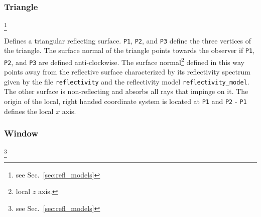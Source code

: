 \documentclass[10pt,a4paper,titlepage]{article}
\begin{document}
\subsubsection{Triangle}







\footnote{see Sec.~\ref{sec:refl_models}}

\vspace{0.25cm}
Defines a triangular reflecting surface. {\tt P1}, {\tt P2}, and {\tt P3} define the three vertices of the triangle. The surface normal of the triangle points towards the observer if {\tt P1}, {\tt P2}, and {\tt P3} are defined anti-clockwise. The surface normal\footnote{local $z$ axis.} defined in this way points away from the reflective surface characterized by its reflectivity spectrum given by the file {\tt reflectivity} and the reflectivity model {\tt reflectivity\_model}. The other surface is non-reflecting and absorbs all rays that impinge on it. The origin of the local, right handed coordinate system is located at {\tt P1} and {\tt P2} - {\tt P1} defines the local $x$ axis. 

\subsubsection{Window}










\footnote{see Sec.~\ref{sec:refl_models}}
\end{document}
